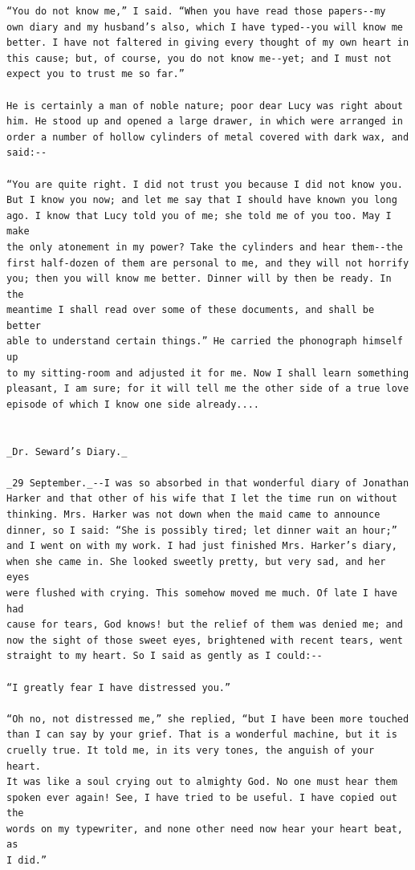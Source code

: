 \documentclass{article}
\begin{document}
\begin{verbatim}
“You do not know me,” I said. “When you have read those papers--my
own diary and my husband’s also, which I have typed--you will know me
better. I have not faltered in giving every thought of my own heart in
this cause; but, of course, you do not know me--yet; and I must not
expect you to trust me so far.”

He is certainly a man of noble nature; poor dear Lucy was right about
him. He stood up and opened a large drawer, in which were arranged in
order a number of hollow cylinders of metal covered with dark wax, and
said:--

“You are quite right. I did not trust you because I did not know you.
But I know you now; and let me say that I should have known you long
ago. I know that Lucy told you of me; she told me of you too. May I make
the only atonement in my power? Take the cylinders and hear them--the
first half-dozen of them are personal to me, and they will not horrify
you; then you will know me better. Dinner will by then be ready. In the
meantime I shall read over some of these documents, and shall be better
able to understand certain things.” He carried the phonograph himself up
to my sitting-room and adjusted it for me. Now I shall learn something
pleasant, I am sure; for it will tell me the other side of a true love
episode of which I know one side already....


_Dr. Seward’s Diary._

_29 September._--I was so absorbed in that wonderful diary of Jonathan
Harker and that other of his wife that I let the time run on without
thinking. Mrs. Harker was not down when the maid came to announce
dinner, so I said: “She is possibly tired; let dinner wait an hour;”
and I went on with my work. I had just finished Mrs. Harker’s diary,
when she came in. She looked sweetly pretty, but very sad, and her eyes
were flushed with crying. This somehow moved me much. Of late I have had
cause for tears, God knows! but the relief of them was denied me; and
now the sight of those sweet eyes, brightened with recent tears, went
straight to my heart. So I said as gently as I could:--

“I greatly fear I have distressed you.”

“Oh no, not distressed me,” she replied, “but I have been more touched
than I can say by your grief. That is a wonderful machine, but it is
cruelly true. It told me, in its very tones, the anguish of your heart.
It was like a soul crying out to almighty God. No one must hear them
spoken ever again! See, I have tried to be useful. I have copied out the
words on my typewriter, and none other need now hear your heart beat, as
I did.”


\end{verbatim}
\end{document}
